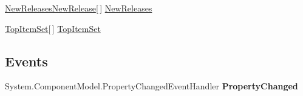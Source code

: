 \begin{DoxyCompactItemize}
\begin{DoxyCompactList}\small\item\em \end{DoxyCompactList}\item 
\hypertarget{class_price___comparison_1_1amazon_1_1ecs_1_1_browse_node_ab5b4e3a21ebc195bca97cc7f9f53ecbe}{\hyperlink{class_price___comparison_1_1amazon_1_1ecs_1_1_new_releases_new_release}{New\-Releases\-New\-Release}\mbox{[}$\,$\mbox{]} \hyperlink{class_price___comparison_1_1amazon_1_1ecs_1_1_browse_node_ab5b4e3a21ebc195bca97cc7f9f53ecbe}{New\-Releases}}\label{class_price___comparison_1_1amazon_1_1ecs_1_1_browse_node_ab5b4e3a21ebc195bca97cc7f9f53ecbe}

\begin{DoxyCompactList}\small\item\em \end{DoxyCompactList}\item 
\hypertarget{class_price___comparison_1_1amazon_1_1ecs_1_1_browse_node_a549adefe079dd570aea94e7fdef486f3}{\hyperlink{class_price___comparison_1_1amazon_1_1ecs_1_1_top_item_set}{Top\-Item\-Set}\mbox{[}$\,$\mbox{]} \hyperlink{class_price___comparison_1_1amazon_1_1ecs_1_1_browse_node_a549adefe079dd570aea94e7fdef486f3}{Top\-Item\-Set}}\label{class_price___comparison_1_1amazon_1_1ecs_1_1_browse_node_a549adefe079dd570aea94e7fdef486f3}

\begin{DoxyCompactList}\small\item\em \end{DoxyCompactList}\end{DoxyCompactItemize}
\subsection*{Events}
\begin{DoxyCompactItemize}
\item 
\hypertarget{class_price___comparison_1_1amazon_1_1ecs_1_1_browse_node_a25a82b3e2ce65a0c6f009023118c22cb}{System.\-Component\-Model.\-Property\-Changed\-Event\-Handler {\bfseries Property\-Changed}}\label{class_price___comparison_1_1amazon_1_1ecs_1_1_browse_node_a25a82b3e2ce65a0c6f009023118c22cb}

\end{DoxyCompactItemize}

